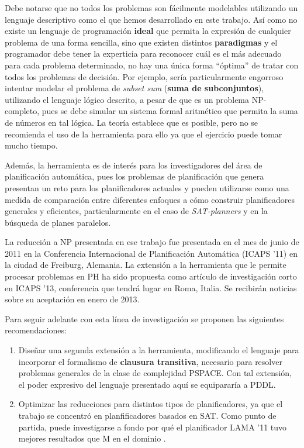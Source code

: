 Debe notarse que no todos los problemas son fácilmente modelables utilizando un
lenguaje descriptivo como el que hemos desarrollado en este trabajo. Así como
no existe un lenguaje de programación \textbf{ideal} que permita la expresión
de cualquier problema de una forma sencilla, sino que existen distintos
\textbf{paradigmas} y el programador debe tener la experticia para reconocer
cuál es el más adecuado para cada problema determinado, no hay una única forma
``óptima'' de tratar con todos los problemas de decisión.
Por ejemplo, sería particularmente engorroso intentar
modelar el problema de \textit{subset sum} (\textbf{suma de subconjuntos}),
utilizando el lenguaje lógico descrito, a pesar de que es un problema
NP-completo, pues se debe simular un sistema formal
aritmético que permita la suma de números en tal lógica. La teoría establece
que es posible, pero no se recomienda el uso de la herramienta para ello ya que
el ejercicio puede tomar mucho tiempo.

Además, la herramienta es de interés para los investigadores del área de
planificación automática, pues los problemas de planificación que genera
presentan un reto para los planificadores actuales y pueden utilizarse como una
medida de comparación entre diferentes enfoques a cómo construir planificadores
generales y eficientes, particularmente en el caso de \textit{SAT-planners} y
en la búsqueda de planes paralelos.

La reducción a NP presentada en ese trabajo fue presentada en el mes de junio
de 2011 en la Conferencia Internacional de
Planificación Automática (ICAPS '11) en la ciudad de Freiburg, Alemania.
La extensión a la herramienta que le permite procesar problemas en PH ha sido
propuesta como artículo de investigación corto en ICAPS '13, conferencia que
tendrá lugar en Roma, Italia. Se recibirán noticias sobre su aceptación en
enero de 2013.

Para seguir adelante con esta línea de investigación se proponen las siguientes
recomendaciones:

\begin{enumerate}[--]
\item Diseñar una segunda extensión a la herramienta, modificando el lenguaje
para incorporar el formalismo de \textbf{clausura transitiva}, necesario para
resolver problemas generales de la clase de complejidad PSPACE. Con tal
extensión, el poder expresivo del lenguaje presentado aquí se equipararía a
PDDL.
\item Optimizar las reducciones para distintos tipos de planificadores, ya que
el trabajo se concentró en planfificadores basados en SAT. Como punto de
partida, puede investigarse a fondo por qué el planificador LAMA '11 tuvo
mejores resultados que M en el dominio \coCOL.
\end{enumerate}
